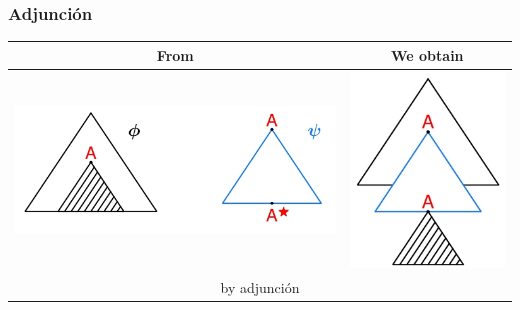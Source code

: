 \documentclass[compress,color=usenames]{beamer}
\begin{document}
\begin{frame}
\frametitle{Adjunci\'on}


\begin{center}
\begin{tabular}{|c|c|} \hline
From & We obtain \\ \hline

\includegraphics[scale=.4]{pics/pic2-22.jpg} & 

\includegraphics[scale=.35]{pics/pic2-23.jpg} \\ \hline

\multicolumn{2}{|c|}{by adjunci\'on}  \\ \hline
\end{tabular}
\end{center}\pause


\end{frame}
\end{document}
